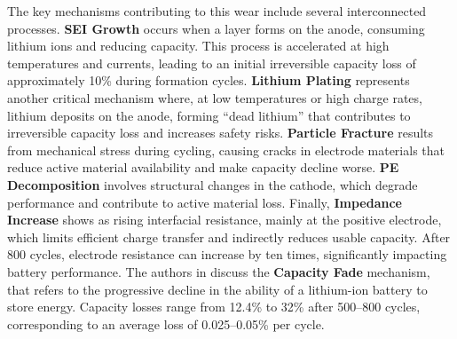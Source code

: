 The key mechanisms contributing to this wear include several interconnected processes. \textbf{SEI Growth} occurs when a layer forms on the anode, consuming lithium ions and reducing capacity. This process is accelerated at high temperatures and currents, leading to an initial irreversible capacity loss of approximately 10\% during formation cycles. \textbf{Lithium Plating} represents another critical mechanism where, at low temperatures or high charge rates, lithium deposits on the anode, forming ``dead lithium'' that contributes to irreversible capacity loss and increases safety risks. \textbf{Particle Fracture} results from mechanical stress during cycling, causing cracks in electrode materials that reduce active material availability and make capacity decline worse. \textbf{PE Decomposition} involves structural changes in the cathode, which degrade performance and contribute to active material loss. Finally, \textbf{Impedance Increase} shows as rising interfacial resistance, mainly at the positive electrode, which limits efficient charge transfer and indirectly reduces usable capacity. After 800 cycles, electrode resistance can increase by ten times, significantly impacting battery performance. The authors in \cite{zhang_studies_2000} discuss the \textbf{Capacity Fade} mechanism, that refers to the progressive decline in the ability of a lithium-ion battery to store energy. Capacity losses range from 12.4\% to 32\% after 500--800 cycles, corresponding to an average loss of 0.025--0.05\% per cycle.

